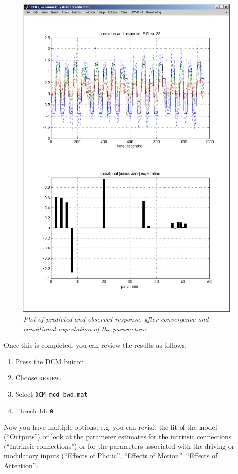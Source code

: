 \begin{figure}[ht]
\begin{center}
\includegraphics[width=140mm]{dcm/Fig8}
\caption{\em Plot of predicted and observed response, after convergence and conditional expectation of the parameters.\label{dcm_fig8}}
\end{center}
\end{figure}

Once this is completed, you can review the results as follows:
\begin{enumerate}
\item Press the DCM button.
\item Choose \textsc{review}.
\item Select \texttt{DCM\_mod\_bwd.mat}
\item Threshold: \texttt{0}
\end{enumerate}
Now you have multiple options, e.g. you can revisit the fit of the model (``Outputs'') or look at the parameter estimates for the intrinsic connections (``Intrinsic connections'') or for the parameters associated with the driving or modulatory inputs (``Effects of Photic'', ``Effects of Motion'', ``Effects of Attention'').

